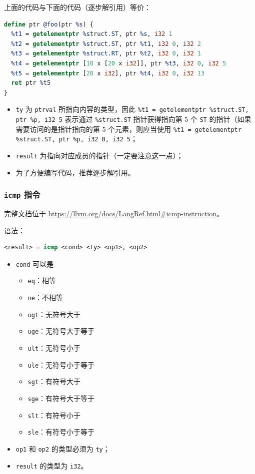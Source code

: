 上面的代码与下面的代码（逐步解引用）等价：
\begin{lstlisting}[language=llvm]define ptr @foo(ptr %s) {
  %t1 = getelementptr %struct.ST, ptr %s, i32 1
  %t2 = getelementptr %struct.ST, ptr %t1, i32 0, i32 2
  %t3 = getelementptr %struct.RT, ptr %t2, i32 0, i32 1
  %t4 = getelementptr [10 x [20 x i32]], ptr %t3, i32 0, i32 5
  %t5 = getelementptr [20 x i32], ptr %t4, i32 0, i32 13
  ret ptr %t5
}
\end{lstlisting}

\begin{itemize}
  \item \texttt{ty} 为 \texttt{ptrval} 所指向内容的类型，因此
    \texttt{\%t1 = getelementptr \%struct.ST, ptr \%p, i32 5}
    表示通过 \texttt{\%struct.ST} 指针获得指向第 5 个 \texttt{ST}
    的指针（如果需要访问的是指针指向的第 5 个元素，则应当使用
    \texttt{\%t1 = getelementptr \%struct.ST, ptr \%p, i32 0, i32 5}；
  \item \texttt{result} 为指向对应成员的指针（一定要注意这一点）；
  \item 为了方便编写代码，推荐逐步解引用。
\end{itemize}

\subsubsection{\texttt{icmp} 指令}\label{LLVM-icmp-instructions}

\begin{remark}
完整文档位于 \url{https://llvm.org/docs/LangRef.html\#icmp-instruction}。
\end{remark}

语法：
\begin{lstlisting}[language=llvm]
<result> = icmp <cond> <ty> <op1>, <op2>
\end{lstlisting}

\begin{itemize}
  \item \texttt{cond} 可以是
    \begin{itemize}
      \item \texttt{eq}：相等
      \item \texttt{ne}：不相等
      \item \texttt{ugt}：无符号大于
      \item \texttt{uge}：无符号大于等于
      \item \texttt{ult}：无符号小于
      \item \texttt{ule}：无符号小于等于
      \item \texttt{sgt}：有符号大于
      \item \texttt{sge}：有符号大于等于
      \item \texttt{slt}：有符号小于
      \item \texttt{sle}：有符号小于等于
    \end{itemize}
  \item \texttt{op1} 和 \texttt{op2} 的类型必须为 \texttt{ty}；
  \item \texttt{result} 的类型为 \texttt{i32}。
\end{itemize}

